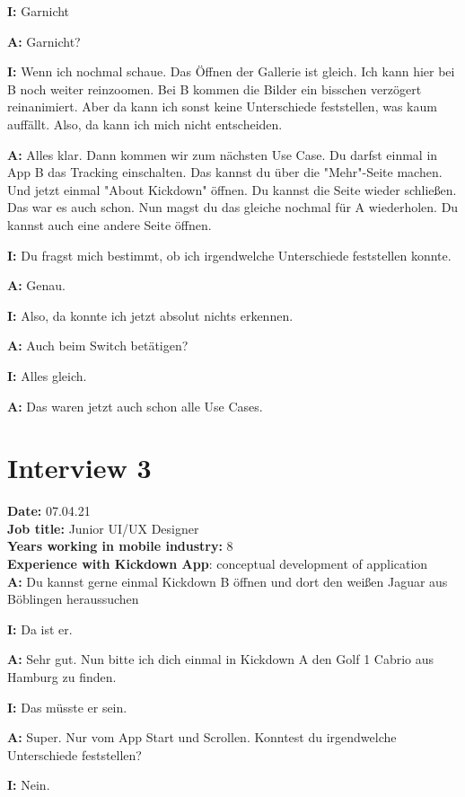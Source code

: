 \begin{myparindent}{0pt}
\textbf{I:} Garnicht

\textbf{A:} Garnicht?

\textbf{I:} Wenn ich nochmal schaue. Das Öffnen der Gallerie ist gleich. Ich kann hier bei B noch weiter reinzoomen. Bei B kommen die Bilder ein bisschen verzögert reinanimiert. Aber da kann ich sonst keine Unterschiede feststellen, was kaum auffällt. Also, da kann ich mich nicht entscheiden.

\textbf{A:} Alles klar. Dann kommen wir zum nächsten Use Case. Du darfst einmal in App B das Tracking einschalten. Das kannst du über die "Mehr"-Seite machen. Und jetzt einmal "About Kickdown" öffnen. Du kannst die Seite wieder schließen. Das war es auch schon. Nun magst du das gleiche nochmal für A wiederholen. Du kannst auch eine andere Seite öffnen.

\textbf{I:} Du fragst mich bestimmt, ob ich irgendwelche Unterschiede feststellen konnte.

\textbf{A:} Genau. 

\textbf{I:} Also, da konnte ich jetzt absolut nichts erkennen.

\textbf{A:} Auch beim Switch betätigen?

\textbf{I:} Alles gleich.

\textbf{A:} Das waren jetzt auch schon alle Use Cases.


\section{Interview 3}
\textbf{Date:} 07.04.21\\
\textbf{Job title:} Junior UI/UX Designer\\
\textbf{Years working in mobile industry:} 8\\
\textbf{Experience with Kickdown App}: conceptual development of application\\

\textbf{A:} Du kannst gerne einmal Kickdown B öffnen und dort den weißen Jaguar aus Böblingen heraussuchen 

\textbf{I:} Da ist er. 

\textbf{A:} Sehr gut. Nun bitte ich dich einmal in Kickdown A den Golf 1 Cabrio aus Hamburg zu finden. 

\textbf{I:} Das müsste er sein. 

\textbf{A:} Super. Nur vom App Start und Scrollen. Konntest du irgendwelche Unterschiede feststellen?

\textbf{I:} Nein.


\end{myparindent}
